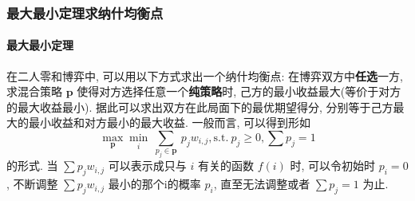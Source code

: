 \subsubsection{最大最小定理求纳什均衡点}
\paragraph{最大最小定理} 在二人零和博弈中,
可以用以下方式求出一个纳什均衡点:
在博弈双方中\textbf{任选}一方,
求混合策略 $\mathbf{p}$ 使得对方选择任意一个\textbf{纯策略}时,
己方的最小收益最大(等价于对方的最大收益最小).
据此可以求出双方在此局面下的最优期望得分,
分别等于己方最大的最小收益和对方最小的最大收益. 一般而言, 可以得到形如
$$\max_{\mathbf{p}} \min_i\ \sum_{p_j\in \mathbf{p}}\ p_jw_{i,j}, \mathrm{s.t. } \ p_j\ge 0, \sum p_j=1 $$
的形式. 当 $\sum p_jw_{i,j}$ 可以表示成只与 $i$ 有关的函数 $f(i)$ 时, 可以令初始时 $p_i=0$, 不断调整 $\sum p_jw_{i,j}$ 最小的那个i的概率 $p_i$, 直至无法调整或者 $\sum p_j=1$ 为止.
